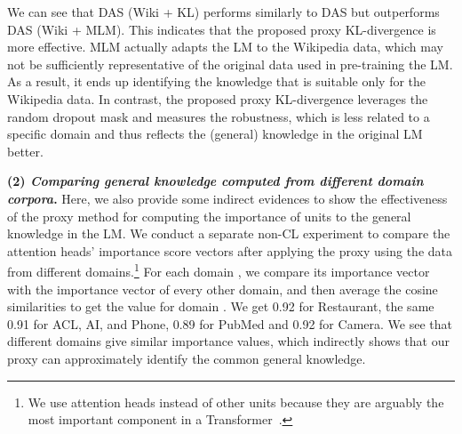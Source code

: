 \documentclass{article} \usepackage{iclr2023_conference,times}
\begin{document}
{We can see that DAS (Wiki + KL) performs similarly to DAS but  outperforms DAS (Wiki + MLM). This indicates that the proposed proxy KL-divergence is more effective. MLM actually adapts the LM to the Wikipedia data, which may not be sufficiently representative of the original data used in pre-training the LM. As a result, it ends up identifying the knowledge that is suitable only for the Wikipedia data. In contrast, the proposed proxy KL-divergence leverages the random dropout mask and measures the robustness, which is less related to a specific domain and thus reflects the (general) knowledge in the original LM better. }



{\color{black}
\textbf{(2) \textit{Comparing general knowledge computed from different domain corpora}.} Here, we also provide some indirect evidences to show the effectiveness of the proxy method for computing the importance of units to the general knowledge in the LM. 
We conduct a separate non-CL experiment to compare the attention heads' importance score vectors  after applying the proxy using the data from different domains.\footnote{{\color{black}We use attention heads instead of other units because they are arguably the most important component in a Transformer~\citep{michel2019sixteen,voita2019analyzing,mccarley2019structured}.}} For each domain , we compare its importance vector with the importance vector of every other domain, and 
then average the cosine similarities to get the value for domain . We get 0.92 for Restaurant, the same 0.91 for ACL, AI, and Phone, 0.89 for PubMed and 0.92 for Camera. We see that different domains give similar importance values, which indirectly shows that our proxy can approximately identify the common general knowledge. 










}
\end{document}
